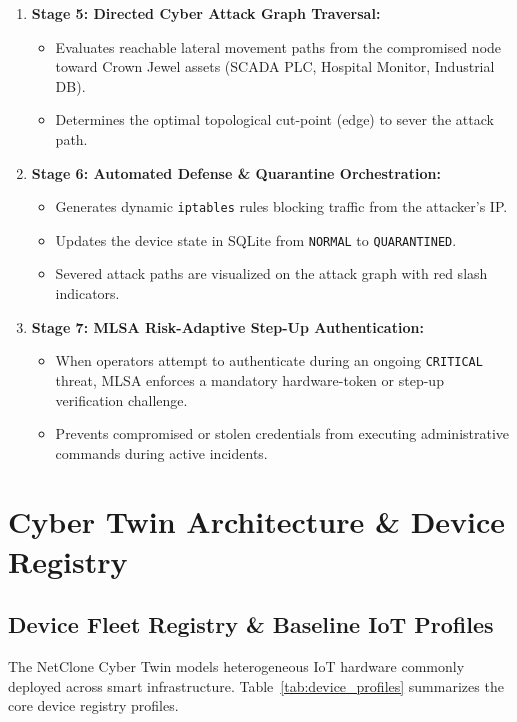 \documentclass[12pt,a4paper]{report}
\begin{document}
\begin{enumerate}
\begin{itemize}
        \item Maps mathematical deviations into natural-language forensic rationales.
    \end{itemize}
    \item \textbf{Stage 5: Directed Cyber Attack Graph Traversal:}
    \begin{itemize}
        \item Evaluates reachable lateral movement paths from the compromised node toward Crown Jewel assets (SCADA PLC, Hospital Monitor, Industrial DB).
        \item Determines the optimal topological cut-point (edge) to sever the attack path.
    \end{itemize}
    \item \textbf{Stage 6: Automated Defense \& Quarantine Orchestration:}
    \begin{itemize}
        \item Generates dynamic \texttt{iptables} rules blocking traffic from the attacker's IP.
        \item Updates the device state in SQLite from \texttt{NORMAL} to \texttt{QUARANTINED}.
        \item Severed attack paths are visualized on the attack graph with red slash indicators.
    \end{itemize}
    \item \textbf{Stage 7: MLSA Risk-Adaptive Step-Up Authentication:}
    \begin{itemize}
        \item When operators attempt to authenticate during an ongoing \texttt{CRITICAL} threat, MLSA enforces a mandatory hardware-token or step-up verification challenge.
        \item Prevents compromised or stolen credentials from executing administrative commands during active incidents.
    \end{itemize}
\end{enumerate}

\chapter{Cyber Twin Architecture \& Device Registry}

\section{Device Fleet Registry \& Baseline IoT Profiles}
The NetClone Cyber Twin models heterogeneous IoT hardware commonly deployed across smart infrastructure. Table~\ref{tab:device_profiles} summarizes the core device registry profiles.
\end{document}
